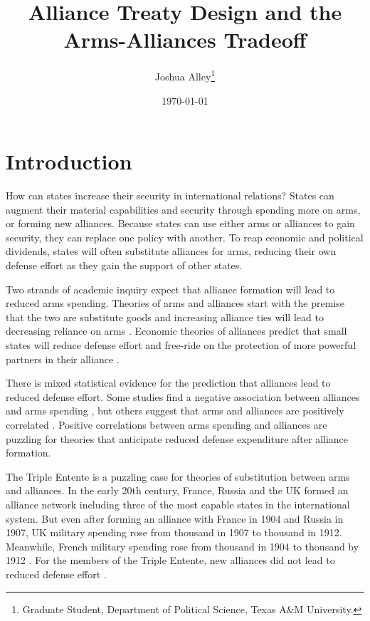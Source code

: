 \documentclass[12pt]{article}
\title{\textbf{Alliance Treaty Design and the Arms-Alliances Tradeoff}}
\author{Joshua Alley\footnote{Graduate Student,
Department of Political Science, Texas A\&M University.}}
\date{{\normalsize \today}}
\begin{document}
\maketitle 

\newpage 

\doublespace 



\section*{Introduction}

How can states increase their security in international relations? States can augment their material capabilities and security through spending more on arms, or forming new alliances. Because states can use either arms or alliances to gain security, they can replace one policy with another. To reap economic and political dividends, states will often substitute alliances for arms, reducing their own defense effort as they gain the support of other states. 

Two strands of academic inquiry expect that alliance formation will lead to reduced arms spending. Theories of arms and alliances start with the premise that the two are substitute goods and increasing alliance ties will lead to decreasing reliance on arms \citep{Morrow1993, Sorokin1994, DigiuseppePoast2016}. Economic theories of alliances predict that small states will reduce defense effort and free-ride on the protection of more powerful partners in their alliance \citep{OlsonZeckhauser1966, SandlerHartley2001}. 

There is mixed statistical evidence for the prediction that alliances lead to reduced defense effort. Some studies find a negative association between alliances and arms spending \citep{Conybeare1992, Morrow1993, Kimball2010, DigiuseppePoast2016}, but others suggest that arms and alliances are positively correlated \citep{Diehl1994, Horowitzetal2017, MorganPalmer2006}. Positive correlations between arms spending and alliances are puzzling for theories that anticipate reduced defense expenditure after alliance formation.

The Triple Entente is a puzzling case for theories of substitution between arms and alliances. In the early 20th century, France, Russia and the UK formed an alliance network including three of the most capable states in the international system. But even after forming an alliance with France in 1904 and Russia in 1907, UK military spending rose from  thousand in 1907 to  thousand in 1912. Meanwhile, French military spending rose from  thousand  in 1904 to  thousand by 1912 \citep{SingerCINC1988}. For the members of the Triple Entente, new alliances did not lead to reduced defense effort \citep{Schmitt1924}. 
\end{document}
